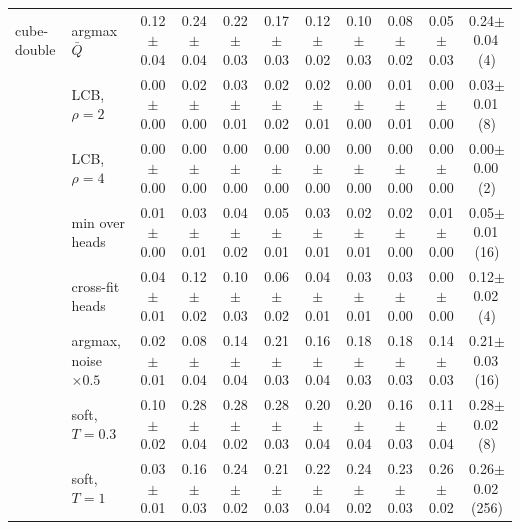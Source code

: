 \begin{tabular}{ll cccccccc c}
\midrule
cube-double & argmax $\bar Q$ & 0.12{\scriptsize$\pm$0.04} & 0.24{\scriptsize$\pm$0.04} & 0.22{\scriptsize$\pm$0.03} & 0.17{\scriptsize$\pm$0.03} & 0.12{\scriptsize$\pm$0.02} & 0.10{\scriptsize$\pm$0.03} & 0.08{\scriptsize$\pm$0.02} & 0.05{\scriptsize$\pm$0.03} & 0.24{\scriptsize$\pm$0.04}\,(4) \\
 & LCB, $\rho{=}2$ & 0.00{\scriptsize$\pm$0.00} & 0.02{\scriptsize$\pm$0.00} & 0.03{\scriptsize$\pm$0.01} & 0.02{\scriptsize$\pm$0.02} & 0.02{\scriptsize$\pm$0.01} & 0.00{\scriptsize$\pm$0.00} & 0.01{\scriptsize$\pm$0.01} & 0.00{\scriptsize$\pm$0.00} & 0.03{\scriptsize$\pm$0.01}\,(8) \\
 & LCB, $\rho{=}4$ & 0.00{\scriptsize$\pm$0.00} & 0.00{\scriptsize$\pm$0.00} & 0.00{\scriptsize$\pm$0.00} & 0.00{\scriptsize$\pm$0.00} & 0.00{\scriptsize$\pm$0.00} & 0.00{\scriptsize$\pm$0.00} & 0.00{\scriptsize$\pm$0.00} & 0.00{\scriptsize$\pm$0.00} & 0.00{\scriptsize$\pm$0.00}\,(2) \\
 & min over heads & 0.01{\scriptsize$\pm$0.00} & 0.03{\scriptsize$\pm$0.01} & 0.04{\scriptsize$\pm$0.02} & 0.05{\scriptsize$\pm$0.01} & 0.03{\scriptsize$\pm$0.01} & 0.02{\scriptsize$\pm$0.01} & 0.02{\scriptsize$\pm$0.00} & 0.01{\scriptsize$\pm$0.00} & 0.05{\scriptsize$\pm$0.01}\,(16) \\
 & cross-fit heads & 0.04{\scriptsize$\pm$0.01} & 0.12{\scriptsize$\pm$0.02} & 0.10{\scriptsize$\pm$0.03} & 0.06{\scriptsize$\pm$0.02} & 0.04{\scriptsize$\pm$0.01} & 0.03{\scriptsize$\pm$0.01} & 0.03{\scriptsize$\pm$0.00} & 0.00{\scriptsize$\pm$0.00} & 0.12{\scriptsize$\pm$0.02}\,(4) \\
 & argmax, noise $\times 0.5$ & 0.02{\scriptsize$\pm$0.01} & 0.08{\scriptsize$\pm$0.04} & 0.14{\scriptsize$\pm$0.04} & 0.21{\scriptsize$\pm$0.03} & 0.16{\scriptsize$\pm$0.04} & 0.18{\scriptsize$\pm$0.03} & 0.18{\scriptsize$\pm$0.03} & 0.14{\scriptsize$\pm$0.03} & 0.21{\scriptsize$\pm$0.03}\,(16) \\
 & soft, $T{=}0.3$ & 0.10{\scriptsize$\pm$0.02} & 0.28{\scriptsize$\pm$0.04} & 0.28{\scriptsize$\pm$0.02} & 0.28{\scriptsize$\pm$0.03} & 0.20{\scriptsize$\pm$0.04} & 0.20{\scriptsize$\pm$0.04} & 0.16{\scriptsize$\pm$0.03} & 0.11{\scriptsize$\pm$0.04} & 0.28{\scriptsize$\pm$0.02}\,(8) \\
 & soft, $T{=}1$ & 0.03{\scriptsize$\pm$0.01} & 0.16{\scriptsize$\pm$0.03} & 0.24{\scriptsize$\pm$0.02} & 0.21{\scriptsize$\pm$0.03} & 0.22{\scriptsize$\pm$0.04} & 0.24{\scriptsize$\pm$0.02} & 0.23{\scriptsize$\pm$0.03} & 0.26{\scriptsize$\pm$0.02} & 0.26{\scriptsize$\pm$0.02}\,(256) \\

\end{tabular}
